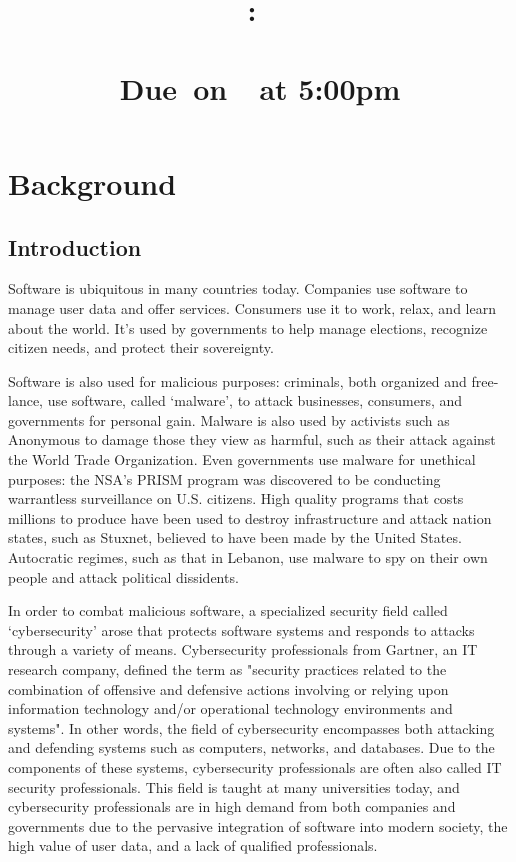 \documentclass[openright]{report}
\title{
    \vspace{2in}
    \LARGE{\textbf{\projectTitle}}\\
    \vspace{0.1in}\large{\reportClass:\ \reportTopic}\\
    \vspace{0.1in}\large{\reportClassInstructor}\\
    \normalsize\vspace{0.1in}\large{Due\ on\ \reportDueDate\ at 5:00pm}
    \vspace{1.4in}
}
\author{\reportAuthorName}
\date{}
\begin{document}
\maketitle

\large{\tableofcontents}

\chapter{Background}

\section{Introduction}

\par Software is ubiquitous in many countries today. Companies use software to manage user data and offer services. Consumers use it to work, relax, and learn about the world. It's used by governments to help manage elections, recognize citizen needs, and protect their sovereignty. 

\par Software is also used for malicious purposes: criminals, both organized and free-lance, use software, called `malware', to attack businesses, consumers, and governments for personal gain. Malware is also used by activists such as Anonymous to damage those they view as harmful, such as their attack against the World Trade Organization\cite{anonymous_attack}. Even governments use malware for unethical purposes: the NSA's PRISM program was discovered to be conducting warrantless surveillance on U.S. citizens\cite{nsa_illegal}. High quality programs that costs millions to produce have been used to destroy infrastructure and attack nation states, such as Stuxnet, believed to have been made by the United States\cite{stuxnet}. Autocratic regimes, such as that in Lebanon, use malware to spy on their own people and attack political dissidents\cite{lebanon}.

\par In order to combat malicious software, a specialized security field called `cybersecurity' arose that protects software systems and responds to attacks through a variety of means. Cybersecurity professionals from Gartner, an IT research company, defined the term as "security practices related to the combination of offensive and defensive actions involving or relying upon information technology and/or operational technology environments and systems"\cite{cyber_def}. In other words, the field of cybersecurity encompasses both attacking and defending systems such as computers, networks, and databases. Due to the components of these systems, cybersecurity professionals are often also called IT security professionals. This field is taught at many universities today, and cybersecurity professionals are in high demand from both companies and governments due to the pervasive integration of software into modern society, the high value of user data, and a lack of qualified professionals.
\end{document}
